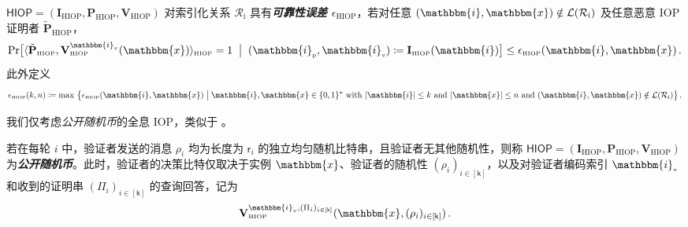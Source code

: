 \documentclass[american,singlepageview]{snargs-book-zh}
\renewcommand{\enspace}{\ensuremath{\thinspace}}
\newcommand{\defemph}[1]{\textbf{\emph{#1}}}
\newcommand{\Bits}{\{0,1\}}
\newcommand{\Malicious}[1]{\tilde{#1}}
\newcommand{\Interact}[2]{\langle #1, #2 \rangle}
\newcommand{\DefineEqual}{\coloneqq}
\newcommand{\SomeSize}[1]{|#1|}
\newcommand{\Language}{\mathcal{L}}
\newcommand{\GetLanguage}[1]{\Language(#1)}
\newcommand{\IndexedRelation}{\mathcal{R}_{\mathrm{i}}}
\newcommand{\Index}{\mathbbm{i}}
\newcommand{\Instance}{\mathbbm{x}}
\newcommand{\IndexSize}{k}
\newcommand{\InstanceSize}{n}
\newcommand{\ProtoIndexer}{I}
\newcommand{\ProtoProver}{P}
\newcommand{\ProtoVerifier}{V}
\newcommand{\ProtoSoundnessError}{\epsilon}
\newcommand{\ProtoRoundComplexity}{\mathsf{k}}
\newcommand{\ProtoRandomnessComplexity}{\mathsf{r}}
\newcommand{\RoundIndex}{i}
\newcommand{\IOPFormat}[1]{\mathbf{#1}}
\newcommand{\IOPString}{\Pi}
\newcommand{\IOPVerifierRandomMessage}{\rho}
\newcommand{\IOPRoundComplexity}{\ProtoRoundComplexity}
\newcommand{\IOPRandomnessComplexity}{\ProtoRandomnessComplexity}
\newcommand{\IOPStrings}{(\IOPString_{\RoundIndex})_{\RoundIndex \in [\IOPRoundComplexity]}}
\newcommand{\IOPVerifierRandomMessages}{(\IOPVerifierRandomMessage_{\RoundIndex})_{\RoundIndex \in [\IOPRoundComplexity]}}
\newcommand{\IOPVerifierInput}{\Instance,\IOPVerifierRandomMessages}
\newcommand{\HIOPSubscript}{\scriptscriptstyle\mathrm{HIOP}}
\newcommand{\HIOPSymbol}{\mathsf{HIOP}}
\newcommand{\HIOPInteract}[2]{\Interact{#1}{#2}_{\HIOPSubscript}}
\newcommand{\HIOPIndexer}{\IOPFormat{\ProtoIndexer}_{\HIOPSubscript}}
\newcommand{\HIOPProver}{\IOPFormat{\ProtoProver}_{\HIOPSubscript}}
\newcommand{\HIOPVerifier}{\IOPFormat{\ProtoVerifier}_{\HIOPSubscript}}
\newcommand{\HIOPSystem}{(\HIOPIndexer,\HIOPProver,\HIOPVerifier)}
\newcommand{\ProverEncodedIndex}{\Index_{{\scriptscriptstyle\mathrm{p}}}}
\newcommand{\VerifierEncodedIndex}{\Index_{{\scriptscriptstyle\mathrm{v}}}}
\newcommand{\HIOPMaliciousProver}{\Malicious{\IOPFormat{\ProtoProver}}_{\HIOPSubscript}}
\newcommand{\HIOPSoundnessError}{\ProtoSoundnessError_{\HIOPSubscript}}
\newcommand{\MaxIndexedSoundness}[1]{\max\, \big\{ #1 \;\big\vert\;\Index,\Instance \in \Bits^{*} \text{ with } \SomeSize{\Index} \leq \IndexSize \text{ and }\SomeSize{\Instance} \leq \InstanceSize \text{ and } (\Index,\Instance) \notin \GetLanguage{\IndexedRelation} \big\}}
\begin{document}
\begin{definition}
\label{definition:hiop-soundness}
$\HIOPSymbol=\HIOPSystem$ 对索引化关系 $\IndexedRelation$ 具有\defemph{可靠性误差 $\HIOPSoundnessError$}，若对任意 $(\Index,\Instance)\notin\GetLanguage{\IndexedRelation}$ 及任意恶意 IOP 证明者 $\HIOPMaliciousProver$，
\[
\Pr\bigl[
  \HIOPInteract{\HIOPMaliciousProver}
             {\HIOPVerifier^{\VerifierEncodedIndex}(\Instance)}=1
\;\bigm|\;
  (\ProverEncodedIndex,\VerifierEncodedIndex)\DefineEqual\HIOPIndexer(\Index)
\bigr]
\le
\HIOPSoundnessError(\Index,\Instance)
\enspace.
\]
此外定义
\[
\HIOPSoundnessError(\IndexSize,\InstanceSize)
  \DefineEqual \MaxIndexedSoundness{\HIOPSoundnessError(\Index,\Instance)}
\enspace.
\]
\end{definition}

我们仅考虑\emph{公开随机币}的全息 IOP，类似于 。

\begin{definition}
\label{definition:hiop-public-coin}
若在每轮 $\RoundIndex$ 中，验证者发送的消息 $\IOPVerifierRandomMessage_{\RoundIndex}$ 均为长度为 $\IOPRandomnessComplexity_{\RoundIndex}$ 的独立均匀随机比特串，且验证者无其他随机性，则称
$\HIOPSymbol=\HIOPSystem$ 为\defemph{公开随机币}。此时，验证者的决策比特仅取决于实例 $\Instance$、验证者的随机性 $\IOPVerifierRandomMessages$，以及对验证者编码索引 $\VerifierEncodedIndex$ 和收到的证明串 $\IOPStrings$ 的查询回答，记为
\[
\HIOPVerifier^{\VerifierEncodedIndex,\IOPStrings}(\IOPVerifierInput)
\enspace.
\]
\end{definition}
\end{document}

